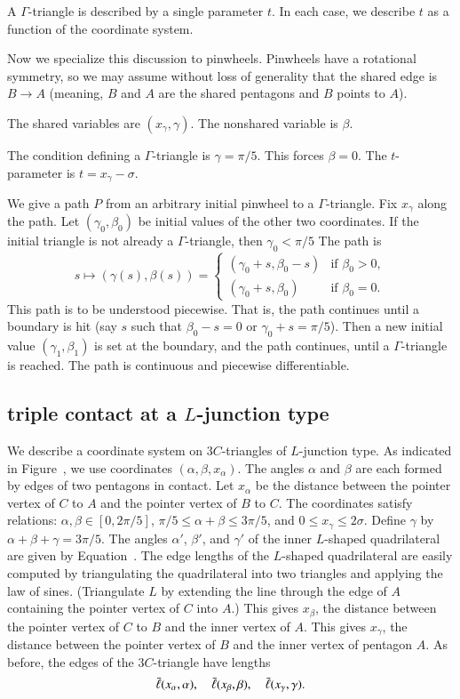 A $\Gamma$-triangle is described by a single parameter $t$.  In each case, we describe $t$ as a function of the
coordinate system.

Now we specialize this discussion to pinwheels.  Pinwheels have a rotational symmetry, so we may assume
without loss of generality that the shared edge is $B\to A$ (meaning, $B$ and $A$ are the shared pentagons
and $B$ points to $A$).

The shared variables are $(x_\gamma,\gamma)$.  The nonshared variable is $\beta$.

The condition defining a $\Gamma$-triangle is $\gamma=\pi/5$.  This forces $\beta=0$. The $t$-parameter is $t =x_\gamma - \sigma$.

We give a path $P$ from an arbitrary initial pinwheel 
to a $\Gamma$-triangle.  Fix $x_\gamma$ along the path.  Let $(\gamma_0,\beta_0)$ be initial values of the other two coordinates.
If the initial triangle is not already a $\Gamma$-triangle, then $\gamma_0 < \pi/5$ 
The path is 
\[
s\mapsto (\gamma(s),\beta(s)) = 
\begin{cases}
(\gamma_0+s,\beta_0-s) & \text{if } \beta_0 > 0,\\
(\gamma_0+s,\beta_0) & \text{if } \beta_0 = 0.
\end{cases}
\]
This path is to be understood piecewise.  That is, the path continues until a boundary is hit (say $s$ such that $\beta_0-s = 0$ or $\gamma_0+s=\pi/5$).
Then a new initial value $(\gamma_1,\beta_1)$ is set at the boundary, and the path continues, until a $\Gamma$-triangle is reached.
The path is continuous and piecewise differentiable.



\subsection{triple contact at a $L$-junction type}

We describe a coordinate system on $3C$-triangles of $L$-junction
type.  As indicated in Figure~, we use coordinates
$(\alpha,\beta,x_\alpha)$.  The angles $\alpha$ and $\beta$ are each
formed by edges of two pentagons in contact.  Let $x_\alpha$ be the
distance between the pointer vertex of $C$ to $A$ and the pointer
vertex of $B$ to $C$.  The coordinates satisfy relations:
$\alpha,\beta\in [0,2\pi/5]$, $\pi/5\le\alpha+\beta\le 3\pi/5$, and
$0\le x_\gamma\le 2\sigma$.  Define $\gamma$ by
$\alpha+\beta+\gamma=3\pi/5$.  The angles $\alpha'$, $\beta'$, and
$\gamma'$ of the inner $L$-shaped quadrilateral are given by
Equation~.  The edge lengths of the $L$-shaped
quadrilateral are easily computed by triangulating the quadrilateral
into two triangles and applying the law of sines.  (Triangulate
$L$ by extending the line through the edge of $A$ containing the
pointer vertex of $C$ into $A$.)  This gives
$x_\beta$, the distance between the pointer vertex of $C$ to $B$ and
the inner vertex of $A$.  This gives $x_\gamma$, the distance between
the pointer vertex of $B$ and the inner vertex of pentagon $A$.
As before, the edges of the $3C$-triangle have lengths
\[
\bar\ell(x_\alpha,\alpha),\quad \bar\ell(x_\beta,\beta),\quad \bar\ell(x_\gamma,\gamma).
\]

